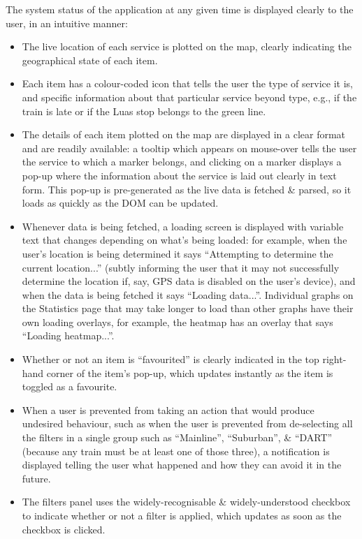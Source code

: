 \documentclass[a4paper,11pt]{report}
\begin{document}
The system status of the application at any given time is displayed clearly to the user, in an intuitive manner:
\begin{itemize}
    \item   The live location of each service is plotted on the map, clearly indicating the geographical state of each item. 
    \item   Each item has a colour-coded icon that tells the user the type of service it is, and specific information about that particular service beyond type, e.g., if the train is late or if the Luas stop belongs to the green line.
    \item   The details of each item plotted on the map are displayed in a clear format and are readily available: 
            a tooltip which appears on mouse-over tells the user the service to which a marker belongs, and clicking on a marker displays a pop-up where the information about the service is laid out clearly in text form.
            This pop-up is pre-generated as the live data is fetched \& parsed, so it loads as quickly as the DOM can be updated.
    \item   Whenever data is being fetched, a loading screen is displayed with variable text that changes depending on what's being loaded:
            for example, when the user's location is being determined it says ``Attempting to determine the current location...'' (subtly informing the user that it may not successfully determine the location if, say, GPS data is disabled on the user's device), and when the data is being fetched it says ``Loading data...''.
            Individual graphs on the Statistics page that may take longer to load than other graphs have their own loading overlays, for example, the heatmap has an overlay that says ``Loading heatmap...''.

    \item   Whether or not an item is ``favourited'' is clearly indicated in the top right-hand corner of the item's pop-up, which updates instantly as the item is toggled as a favourite.

    \item   When a user is prevented from taking an action that would produce undesired behaviour, such as when the user is prevented from de-selecting all the filters in a single group such as ``Mainline'', ``Suburban'', \& ``DART'' (because any train must be at least one of those three), a notification is displayed telling the user what happened and how they can avoid it in the future.

    \item   The filters panel uses the widely-recognisable \& widely-understood checkbox to indicate whether or not a filter is applied, which updates as soon as the checkbox is clicked.
\end{itemize}
\end{document}
